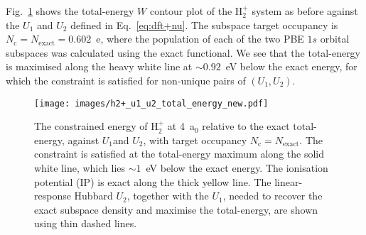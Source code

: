 Fig.~\ref{fig:h2+_u1_u2_total_energy} 
shows the total-energy $W$ contour plot 
of the H$_2^+$ system as before 
against the $U_1$ and $U_2$
defined in Eq.~\eqref{eq:dft+nu}.
%
The subspace target occupancy is 
$N_\textrm{c}=N_\textrm{exact}=0.602$~e, 
where the population of each of the
two PBE $1s$ orbital subspaces  
was calculated using the exact functional.
%
We see that the total-energy is 
maximised along the heavy white line 
at $\sim 0.92$~eV below the exact energy, 
for which the constraint is satisfied 
for non-unique pairs of $(U_1,U_2)$.

\begin{figure}[th!]
\centering
\texttt{[image: images/h2+\_u1\_u2\_total\_energy\_new.pdf]}
\caption[Constraint energy landscape of H$_2^+$ vs Lagrange multipliers $U_1$ and $U_2$]{
The constrained energy of H$_2^+$ at 4~a$_0$ 
relative to the exact total-energy, 
against $U_1$and $U_2$,  
with target occupancy $N_\textrm{c} = N_\textrm{exact}$.
%
The constraint is satisfied at the  
total-energy maximum along the 
solid white line, 
which lies $\sim 1$~eV below 
the exact energy.
%
The ionisation potential (IP) is exact  
along the thick yellow line.
%
The linear-response Hubbard $U_2$, 
together with the  $U_1$,  
needed to recover the 
exact subspace density and maximise the total-energy, 
are shown using thin dashed lines.}
\label{fig:h2+_u1_u2_total_energy}
\end{figure}


